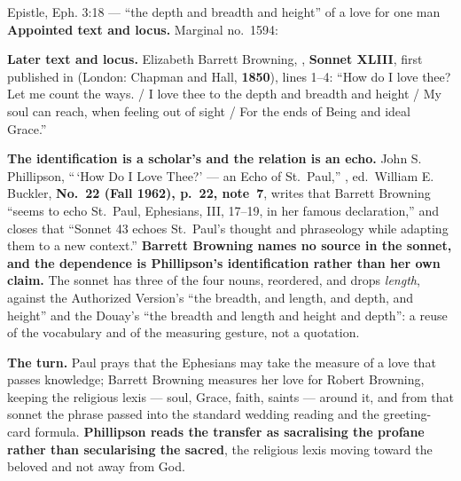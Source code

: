\begin{afterlife}{Epistle, Eph. 3:18 --- ``the depth and breadth and height'' of a love for one man}
\textbf{Appointed text and locus.} Marginal no.~1594: 

\textbf{Later text and locus.} Elizabeth Barrett Browning, , \textbf{Sonnet XLIII}, first published in  (London:
Chapman and Hall, \textbf{1850}), lines 1--4: ``How do I love thee? Let me count
the ways. / I love thee to the depth and breadth and height / My soul can reach,
when feeling out of sight / For the ends of Being and ideal Grace.''

\textbf{The identification is a scholar's and the relation is an echo.} John S.
Phillipson, ``\,`How Do I Love Thee?' --- an Echo of St.~Paul,'' , ed.\ William E. Buckler, \textbf{No.~22 (Fall 1962),
p.~22, note~7}, writes that Barrett Browning ``seems to echo St.~Paul,
Ephesians, III, 17--19, in her famous declaration,'' and closes that ``Sonnet 43
echoes St.~Paul's thought and phraseology while adapting them to a new
context.'' \textbf{Barrett Browning names no source in the sonnet, and the
dependence is Phillipson's identification rather than her own claim.} The sonnet has three of the four
nouns, reordered, and drops \emph{length}, against the Authorized Version's
``the breadth, and length, and depth, and height'' and the Douay's ``the breadth
and length and height and depth'': a reuse of the vocabulary and of the
measuring gesture, not a quotation.

\textbf{The turn.} Paul prays that the Ephesians may take the measure of a love
that passes knowledge; Barrett Browning measures her love for Robert Browning,
keeping the religious lexis --- soul, Grace, faith, saints --- around it, and
from that sonnet the phrase passed into the standard wedding reading and the
greeting-card formula. \textbf{Phillipson reads the transfer as sacralising the
profane rather than secularising the sacred}, the religious lexis moving toward
the beloved and not away from God.
\end{afterlife}

